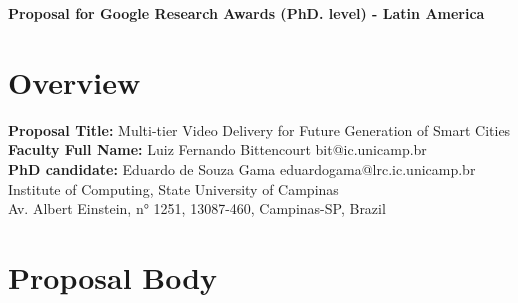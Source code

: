 \documentclass[a4paper, 11pt]{article}
\begin{document}
	\begin{center}
		{\bf Proposal for Google Research Awards (PhD. level) - Latin America}
	\end{center}

	\section{Overview}

	\noindent
	{\bf Proposal Title:} Multi-tier Video Delivery for Future Generation of Smart Cities \\
	{\bf Faculty Full Name:} Luiz Fernando Bittencourt \hfill bit@ic.unicamp.br \\
	{\bf PhD candidate:} Eduardo de Souza Gama \hfill eduardogama@lrc.ic.unicamp.br \\
	Institute of Computing, State University of Campinas \\
	Av. Albert Einstein, n° 1251, 13087-460, Campinas-SP, Brazil \\


	\section{Proposal Body}	
	
	
	
    

    
    
    
    
\end{document}
